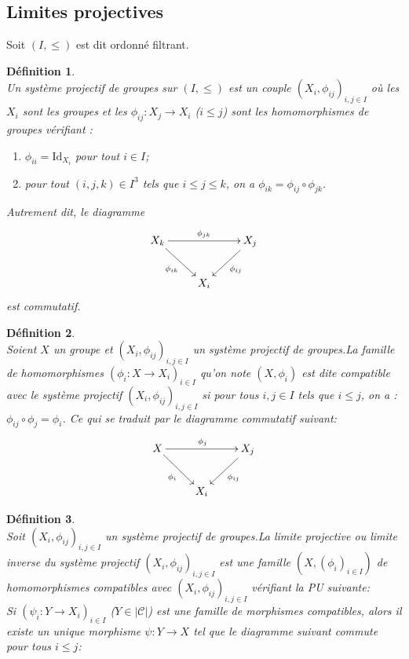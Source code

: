\documentclass[a4paper, 14pt]{report}
\newtheorem{definition}{Définition}[section]
\begin{document}
\begin{onehalfspace}
{\subsection{Limites projectives}
Soit $(I,\leq)$ est dit ordonné filtrant.
\begin{definition} \cite{maclane1971categories}\\
	Un système projectif de groupes sur $(I,\leq)$ est un couple $(X_{i},\phi_{ij})_{i,j \in I}$ où les $X_{i}$ sont les groupes et les $\phi_{ij}:X_{j} \rightarrow X_{i}$  ($i \leq j$) sont les homomorphismes de groupes vérifiant :
	\begin{enumerate}[label=\roman*)]
		\item $\phi_{ii} = \text{Id}_{X_{i}}$ pour tout $i \in I$;
		\item pour tout $(i,j,k) \in I^{3}$ tels que $i \leq j \leq k$, on a $\phi_{ik} = \phi_{ij} \circ \phi_{jk}$.
	\end{enumerate}
	Autrement dit, le diagramme
	\[
	\xymatrix{
		X_{k} \ar[rr]^{\phi_{jk}} \ar[dr]_{\phi_{ik}} & & X_{j} \ar[dl]^{\phi_{ij}} \\
		& X_{i} &
	}
	\]
	est commutatif.
\end{definition}


\begin{definition}  \cite{maclane1971categories}\\
Soient $X$ un groupe et $(X_{i}, \phi_{ij})_{i,j \in I}$ un système projectif de groupes.La famille de homomorphismes $(\phi_{i} : X \rightarrow X_{i})_{i \in I}$ qu'on note $( X ,\phi_{i})$ est dite compatible avec le système projectif $(X_{i}, \phi_{ij})_{i,j \in I}$ si pour tous $i,j \in I$ tels que $i \leq j$, on a : $\phi_{ij} \circ \phi_{j} = \phi_{i}$.
	Ce qui se traduit par le diagramme commutatif suivant:
	\[
	\xymatrix{
		X \ar[rr]^{\phi_{j}} \ar[dr]_{\phi_{i}} & & X_{j} \ar[dl]^{\phi_{ij}} \\
		& X_{i} &
	}
	\]
	
\end{definition}

\begin{definition}  \cite{maclane1971categories}\\
	Soit $(X_{i},\phi_{ij})_{i,j \in I}$ un système projectif de groupes.La limite projective ou limite inverse du système projectif $(X_{i},\phi_{ij})_{i,j \in I}$  est une famille $(X,(\phi_{i})_{i \in I})$ de homomorphismes compatibles avec $(X_{i},\phi_{ij})_{i,j \in I}$ vérifiant la PU suivante: \\
	Si $(\psi _{i} : Y \rightarrow X_{i})_{i \in I}$ ($ Y \in |\mathcal{C}|$) est une famille de morphismes compatibles, alors il existe un unique morphisme $\psi : Y \rightarrow X $ tel que le diagramme suivant commute pour tous $i \leq j$:
	

\end{definition}}
\end{onehalfspace}
\end{document}
